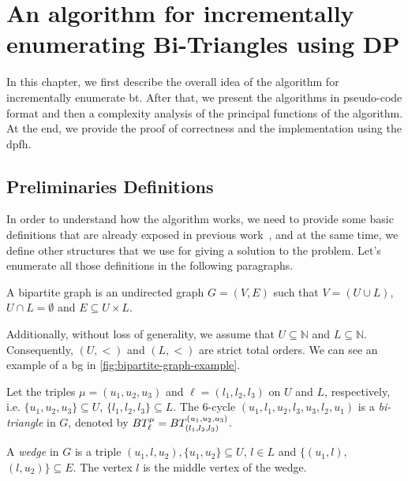 \chapter{An algorithm for incrementally enumerating Bi-Triangles using DP}\label{incr-algo-bt-dp}
In this chapter, we first describe the overall idea of the algorithm for incrementally enumerate 
\acrshort{bt}. After that, we present the algorithms in pseudo-code format and then a complexity analysis of the principal functions of the algorithm.
At the end, we provide the proof of correctness and the implementation using the \acrshort{dpfh}.  

\section{Preliminaries Definitions}
In order to understand how the algorithm works, we need to provide some basic definitions that are already exposed in previous work~\cite{btcount}, and
at the same time, we define other structures that we use for giving a solution to the problem.
Let's enumerate all those definitions in the following paragraphs.

\begin{definition}[\acrlong{bg}] 
A bipartite graph is an undirected graph $G=(V,E)$  such that $V=(U\cup L)$, $U\cap L=\emptyset$ and $E\subseteq U\times L$.\cite{Bondy1976}
\end{definition}

Additionally, without loss of generality, we assume that  $U\subseteq \mathbb{N}$ and $L\subseteq \mathbb{N}$. Consequently, $(U,<)$  and $(L,<)$ are strict total orders. We can see an example of a \acrshort{bg}
in \autoref{fig:bipartite-graph-example}.

\begin{definition}[\acrlong{bt}]\label{def:bt}
Let the triples $\mu=(u_1, u_2, u_3)$ and $\ell=(l_1, l_2,l_3)$ on $U$ and $L$, respectively, i.e.  $\{u_1, u_2, u_3\} \subseteq U$, $\{l_1, l_2,l_3\} \subseteq L$. 
The 6-cycle $(u_1,l_1,u_2,l_3,u_3,l_2,u_1)$  is a \textit{bi-triangle} in $G$, denoted by $BT_{\ell}^{\mu} = BT_{(l_1, l_2,l_3)}^{(u_1, u_2, u_3)}$. 
\end{definition}      

\begin{definition}[\acrfull{wg}]
A \textit{wedge} in $G$ is a triple $(u_1,l,u_2), \{u_1,u_2\}\subseteq U$, $l \in L$ and $\{(u_1,l),$ $(l,u_2)\} \subseteq E$. The vertex $l$ is the middle vertex of the wedge. 
\end{definition}

